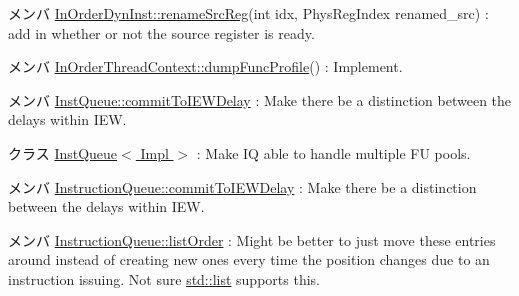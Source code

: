 \label{todo__todo000019}
\hypertarget{todo__todo000019}{}
 
\begin{DoxyDescription}
\item[メンバ \hyperlink{classInOrderDynInst_af3d4e52aa8ea0b526cd9f78f67127f36}{InOrderDynInst::renameSrcReg}(int idx, PhysRegIndex renamed\_\-src) ]: add in whether or not the source register is ready. 
\end{DoxyDescription}

\label{todo__todo000025}
\hypertarget{todo__todo000025}{}
 
\begin{DoxyDescription}
\item[メンバ \hyperlink{classInOrderThreadContext_a13fa12d1779a94a1e0b968946a1367c7}{InOrderThreadContext::dumpFuncProfile}() ]: Implement. 
\end{DoxyDescription}

\label{todo__todo000043}
\hypertarget{todo__todo000043}{}
 
\begin{DoxyDescription}
\item[メンバ \hyperlink{classInstQueue_a92c8d68d5f0e17758f89daa2647196f5}{InstQueue::commitToIEWDelay} ]: Make there be a distinction between the delays within IEW. 
\end{DoxyDescription}

\label{todo__todo000042}
\hypertarget{todo__todo000042}{}
 
\begin{DoxyDescription}
\item[クラス \hyperlink{classInstQueue}{InstQueue$<$ Impl $>$} ]: Make IQ able to handle multiple FU pools. 
\end{DoxyDescription}

\label{todo__todo000032}
\hypertarget{todo__todo000032}{}
 
\begin{DoxyDescription}
\item[メンバ \hyperlink{classInstructionQueue_a6b6fe1148ed7c40758e45f351c375552}{InstructionQueue::commitToIEWDelay} ]: Make there be a distinction between the delays within IEW. 
\end{DoxyDescription}

\label{todo__todo000031}
\hypertarget{todo__todo000031}{}
 
\begin{DoxyDescription}
\item[メンバ \hyperlink{classInstructionQueue_afd5860c9cc9c225411df38dd3dc89b87}{InstructionQueue::listOrder} ]: Might be better to just move these entries around instead of creating new ones every time the position changes due to an instruction issuing. Not sure \hyperlink{classstd_1_1list}{std::list} supports this. 
\end{DoxyDescription}

